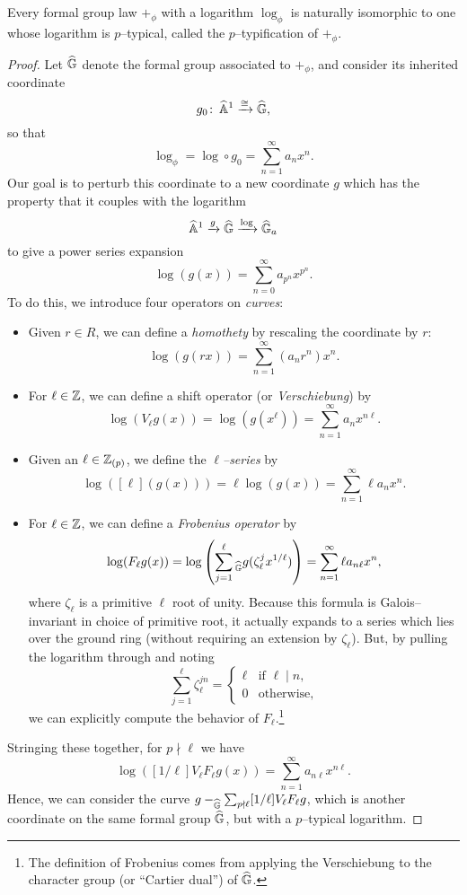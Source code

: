 \begin{lemma}\label{EveryLogHaspTypification}
Every formal group law $+_\phi$ with a logarithm $\log_\phi$ is naturally isomorphic to one whose logarithm is $p$--typical, called the $p$--typification of $+_\phi$.
\end{lemma}
\begin{proof}
Let $\widehat{\mathbb G}$ denote the formal group associated to $+_\phi$, and consider its inherited coordinate \[g_0\colon\thinspace \widehat{\mathbb{A}}^1 \xrightarrow{\cong} \widehat{\mathbb G},\] so that \[\log_\phi = \log \circ g_0 = \sum_{n=1}^\infty a_n x^n.\]  Our goal is to perturb this coordinate to a new coordinate $g$ which has the property that it couples with the logarithm \[\widehat{\mathbb{A}}^1 \xrightarrow{g} \widehat{\mathbb G} \xrightarrow{\log} \widehat{\mathbb G}_a\] to give a power series expansion \[\log(g(x)) = \sum_{n=0}^\infty a_{p^n} x^{p^n}.\]  To do this, we introduce four operators on \emph{curves}:
\begin{itemize}
\item Given $r \in R$, we can define a \textit{homothety} by rescaling the coordinate by $r$: \[\log(g(rx)) = \sum_{n=1}^\infty (a_n r^n) x^n.\]
\item For $\ell \in \mathbb Z$, we can define a shift operator (or \textit{Verschiebung}) by \[\log(V_\ell g(x)) = \log(g(x^\ell)) = \sum_{n=1}^\infty a_n x^{n \ell}.\]
\item Given an $\ell \in \mathbb Z_{(p)}$, we define the \textit{$\ell$--series} by \[\log([\ell](g(x))) = \ell \log(g(x)) = \sum_{n=1}^\infty \ell a_n x^n.\]
\item For $\ell \in \mathbb Z$, we can define a \textit{Frobenius operator} by \[\log(F_\ell g(x)) = \log\left(\sum_{j=1}^\ell{}_{\widehat{\mathbb G}} g(\zeta_\ell^j x^{1/\ell}) \right) = \sum_{n=1}^\infty \ell a_{n \ell} x^n,\] where $\zeta_\ell$ is a primitive $\ell${\th} root of unity.  Because this formula is Galois--invariant in choice of primitive root, it actually expands to a series which lies over the ground ring (without requiring an extension by $\zeta_\ell$).  But, by pulling the logarithm through and noting \[\sum_{j=1}^\ell \zeta_\ell^{jn} = \begin{cases}\ell & \text{if $\ell \mid n$}, \\ 0 & \text{otherwise}, \end{cases}\] we can explicitly compute the behavior of $F_\ell$.\footnote{The definition of Frobenius comes from applying the Verschiebung to the character group (or ``Cartier dual'') of $\widehat{\mathbb G}$.}
\end{itemize}
Stringing these together, for $p \nmid \ell$ we have \[\log([1/\ell] V_\ell F_\ell g(x)) = \sum_{n=1}^\infty a_{n \ell} x^{n \ell}.\]  Hence, we can consider the curve $g -_{\widehat{\mathbb G}} \sum_{p \nmid \ell} [1/\ell] V_\ell F_\ell g$, which is another coordinate on the same formal group $\widehat{\mathbb G}$, but with a $p$--typical logarithm.
\end{proof}

